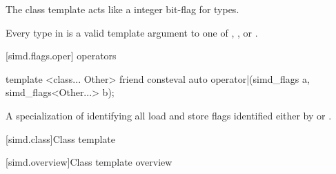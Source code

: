 \pnum
\begin{note}
The class template  acts like a integer bit-flag for types.
\end{note}

\pnum\constraints
Every type in  is a valid template argument to one of
, , or
.

[simd.flags.oper]{ operators}

\begin{itemdecl}
template <class... Other>
  friend consteval auto operator|(simd_flags a, simd_flags<Other...> b);
\end{itemdecl}

\begin{itemdescr}
  \pnum\returns
  A specialization of  identifying all load and
  store flags identified either by  or .
\end{itemdescr}

[simd.class]{Class template }

[simd.overview]{Class template  overview}

